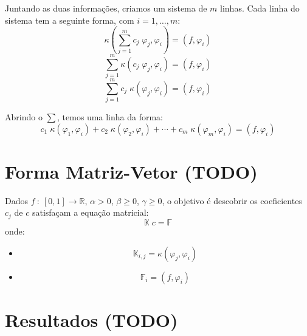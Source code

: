 \documentclass[a4paper]{article}
\newcommand{\typ}{\::\:}
\newcommand{\vphi}{\varphi}
\begin{document}
Juntando as duas informações,
criamos um sistema de \(m\) linhas.
Cada linha do sistema tem a seguinte forma,
com \(i = 1, \dots, m\):
\[
    \kappa(\sum_{j=1}^m{ c_j \; \vphi_j }, \vphi_i) = (f, \vphi_i)
\] \[
    \sum_{j=1}^m{ \kappa(c_j \; \vphi_j, \vphi_i) } = (f, \vphi_i)
\] \[
    \sum_{j=1}^m{ c_j \; \kappa(\vphi_j, \vphi_i) } = (f, \vphi_i)
\]

Abrindo o \(\sum\), temos uma linha da forma:
\[
    c_1 \; \kappa(\vphi_1, \vphi_i)
    + c_2 \; \kappa(\vphi_2, \vphi_i)
    + \cdots
    + c_m \; \kappa(\vphi_m, \vphi_i)
    = (f, \vphi_i)
\]

\section{Forma Matriz-Vetor (TODO)}

Dados
\(f \typ [0, 1] \to \mathbb{R}\),
\(\alpha > 0\),
\(\beta \ge 0\),
\(\gamma \ge 0\),
o objetivo é descobrir os coeficientes \(c_j\)
de \(c\)
satisfaçam a equação matricial:
\[
    \mathbb{K} \; c = \mathbb{F}
\]
onde:
\begin{itemize}
\item \[
    \mathbb{K}_{i, j} = \kappa(\vphi_j, \vphi_i)
\]
\item \[
    \mathbb{F}_i = (f, \vphi_i)
\]
\end{itemize}

\newpage %
\section{Resultados (TODO)}

\end{document}
